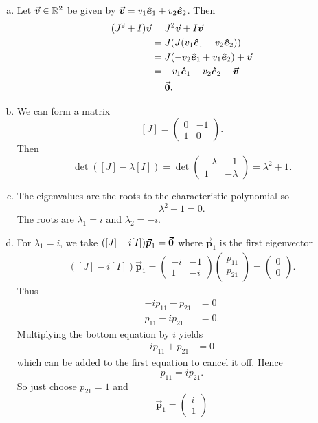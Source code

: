 \documentclass[12pt]{article} %
\newcommand{\ehat}{\boldsymbol{\hat{e}}}
\newcommand{\bvec}[1]{\boldsymbol{\vec{#1}}}
\begin{document}
\begin{solution}
\begin{enumerate}[(a)]
\item Let $\boldsymbol{\vec{v}} \in \mathbb{R}^2$ be given by $\vecv = v_1 \ehat_1 + v_2 \ehat_2$. Then
\begin{align*}
(J^2+I)\vecv &= J^2 \vecv + I \vecv\\
& = J (J(v_1 \ehat_1 + v_2 \ehat_2)) \\
&= J(-v_2 \ehat_1 + v_1 \ehat_2) + \vecv\\
&= -v_1 \ehat_1 - v_2 \ehat_ 2 + \vecv\\
&= \zerovec.
\end{align*}
\item We can form a matrix
\[
[J] = \begin{pmatrix} 0 & -1 \\ 1 & 0 \end{pmatrix}.
\]
Then
\[
\det([J]- \lambda [I]) = \det \begin{pmatrix} -\lambda & -1 \\ 1 & - \lambda \end{pmatrix} = \lambda^2 + 1.
\]
\item The eigenvalues are the roots to the characteristic polynomial so
\[
\lambda^2 + 1 = 0.
\]
The roots are $\lambda_1 = i$ and $\lambda_2 = -i$.
\item For $\lambda_1=i$, we take $([J]-i[I])\bvec{p}_1 = \zerovec$ where $\bvec{p}_1$ is the first eigenvector
\begin{align*}
([J]-i[I])\bvec{p}_1  =\begin{pmatrix} -i & -1 \\ 1 & -i \end{pmatrix} \begin{pmatrix} p_{11} \\ p_{21} \end{pmatrix} = \begin{pmatrix} 0 \\ 0 \end{pmatrix}.
\end{align*}
Thus
\begin{align*}
    -i p_{11} - p_{21} &= 0\\
    p_{11} - ip_{21} &= 0.
\end{align*}
Multiplying the bottom equation by $i$ yields
\begin{align*}
    i p_{11} + p_{21} &= 0
\end{align*}
which can be added to the first equation to cancel it off. Hence
\[
p_{11} = ip_{21}.
\]
So just choose $p_{21}=1$ and
\[
\bvec{p}_1 = \begin{pmatrix} i \\ 1 \end{pmatrix}
\]


\end{enumerate}
\end{solution}
\end{document}
